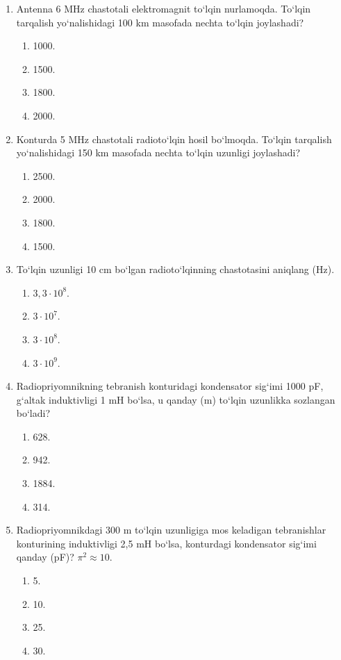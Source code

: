 \begin{enumerate}
\item Antenna 6 MHz chastotali elektromagnit to‘lqin nurlamoqda. To‘lqin tarqalish yo‘nalishidagi 100 km masofada nechta to‘lqin joylashadi?
\begin{enumerate}[label=\Alph*)]
\item 1000.
\item 1500.
\item 1800.
\item 2000.
\end{enumerate}

\item Konturda 5 MHz chastotali radioto‘lqin hosil bo‘lmoqda. To‘lqin tarqalish yo‘nalishidagi 150 km masofada nechta to‘lqin uzunligi joylashadi?
\begin{enumerate}[label=\Alph*)]
\item 2500.
\item 2000.
\item 1800.
\item 1500.
\end{enumerate}

\item To‘lqin uzunligi 10 cm bo‘lgan radioto‘lqinning chastotasini aniqlang (Hz).
\begin{enumerate}[label=\Alph*)]
\item $3,3\cdot 10^8$.
\item $3\cdot 10^7$.
\item $3\cdot 10^8$.
\item $3\cdot 10^9$.
\end{enumerate}

\setcounter{enumi}{8}
\item Radiopriyomnikning tebranish konturidagi kondensator sig‘imi 1000 pF, g‘altak induktivligi 1 mH bo‘lsa, u qanday (m) to‘lqin uzunlikka sozlangan bo‘ladi?
\begin{enumerate}[label=\Alph*)]
\item 628.
\item 942.
\item 1884.
\item 314.
\end{enumerate}

\item Radiopriyomnikdagi 300 m to‘lqin uzunligiga mos keladigan tebranishlar konturining induktivligi 2,5 mH bo‘lsa, konturdagi kondensator sig‘imi qanday (pF)? $\pi^2\approx 10$.
\begin{enumerate}[label=\Alph*)]
\item 5.
\item 10.
\item 25.
\item 30.
\end{enumerate}


\end{enumerate}
